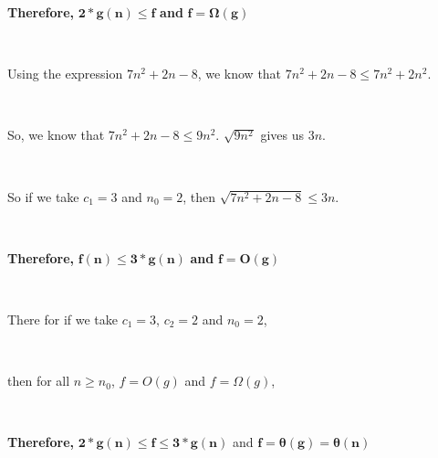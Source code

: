 \documentclass[12pt, letterpaper, twoside]{article}
\begin{document}
\centerline{\textbf{Therefore, } $\mathbf{2 * g(n) \leq f}$ \textbf{ and } $\mathbf{f = \Omega(g)}$}\\
\break
\centerline{Using the expression $7n^2 + 2n - 8$, we know that $7n^2 + 2n - 8 \leq 7n^2 + 2n^2$.}\\
\centerline{So, we know that $7n^2 + 2n - 8 \leq 9n^2$. $\sqrt{9n^2}$ gives us $3n$.}\\
\centerline{So if we take $c_{1} = 3$ and $n_{0} = 2$, then $\sqrt{7n^2 + 2n - 8} \leq 3n$.}\\
\centerline{\textbf{Therefore,} $\mathbf{f(n) \leq 3 * g(n)}$ \textbf{and} $\mathbf{f = O(g)}$}\\
\break
\centerline{There for if we take $c_{1} = 3$, $c_{2} = 2$ and $n_{0} = 2$, }\\
\centerline{then for all $n \geq n_{0}$, $f = O(g)$ and $f = \Omega (g)$,}\\
\centerline{\textbf{Therefore,} $\mathbf{2 * g(n) \leq f \leq 3 * g(n)}$ and $\mathbf{f = \theta(g) = \theta(n)}$}\\
\end{document}
